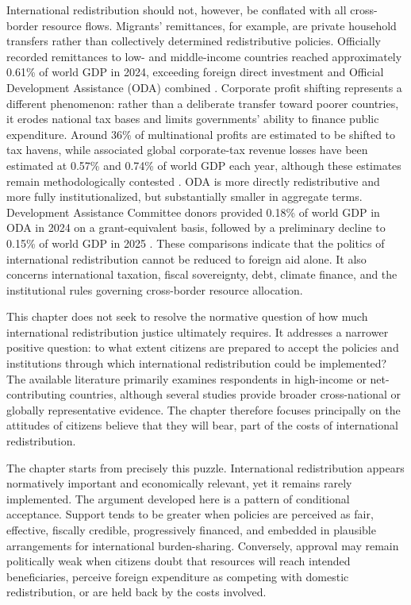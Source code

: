 International redistribution should not, however, be conflated with all cross-border resource flows. Migrants' remittances, for example, are private household transfers rather than collectively determined redistributive policies. Officially recorded remittances to low- and middle-income countries reached approximately 0.61\% of world GDP in 2024, exceeding foreign direct investment and Official Development Assistance (ODA) combined \citep{ratha_remittances_2024}. Corporate profit shifting represents a different phenomenon: rather than a deliberate transfer toward poorer countries, it erodes national tax bases and limits governments' ability to finance public expenditure. Around 36\% of multinational profits are estimated to be shifted to tax havens, while associated global corporate-tax revenue losses have been estimated at 0.57\% and 0.74\% of world GDP each year,  although these estimates remain methodologically contested \citep{torslov_missing_2023, cobham_global_2018}. ODA is more directly redistributive and more fully institutionalized, but substantially smaller in aggregate terms. Development Assistance Committee donors provided 0.18\% of world GDP in ODA in 2024 on a grant-equivalent basis, followed by a preliminary decline to 0.15\% of world GDP in 2025 \citep{oecd_final_oda_2025, oecd_preliminary_oda_2026}. 
These comparisons indicate that the politics of international redistribution cannot be reduced to foreign aid alone. It also concerns international taxation, fiscal sovereignty, debt, climate finance, and the institutional rules governing cross-border resource allocation.

This chapter does not seek to resolve the normative question of how much international redistribution justice ultimately requires. It addresses a narrower positive question: to what extent citizens are prepared to accept the policies and institutions through which international redistribution could be implemented? The available literature primarily examines respondents in high-income or net-contributing countries, although several studies provide broader cross-national or globally representative evidence. The chapter therefore focuses principally on the attitudes of citizens  believe that they will bear, part of the costs of international redistribution.

The chapter starts from precisely this puzzle. International redistribution appears normatively important and economically relevant, yet it remains rarely implemented. The argument developed here is a pattern of conditional acceptance. Support tends to be greater when policies are perceived as fair, effective, fiscally credible, progressively financed, and embedded in plausible arrangements for international burden-sharing. Conversely, approval may remain politically weak when citizens doubt that resources will reach intended beneficiaries, perceive foreign expenditure as competing with domestic redistribution, or are held back by the costs involved.

